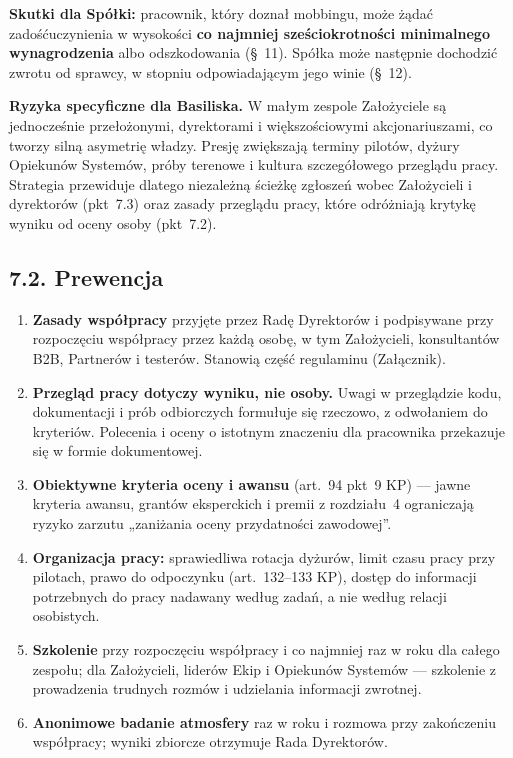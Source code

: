 \documentclass[11pt,a4paper]{report}
\begin{document}
\textbf{Skutki dla Spółki:} pracownik, który doznał mobbingu, może żądać zadośćuczynienia w wysokości \textbf{co najmniej sześciokrotności minimalnego wynagrodzenia} albo odszkodowania (§~11). Spółka może następnie dochodzić zwrotu od sprawcy, w stopniu odpowiadającym jego winie (§~12).

\begin{Prawo}
\textbf{Ryzyka specyficzne dla Basiliska.} W małym zespole Założyciele są jednocześnie przełożonymi, dyrektorami i większościowymi akcjonariuszami, co tworzy silną asymetrię władzy. Presję zwiększają terminy pilotów, dyżury Opiekunów Systemów, próby terenowe i kultura szczegółowego przeglądu pracy. Strategia przewiduje dlatego niezależną ścieżkę zgłoszeń wobec Założycieli i dyrektorów (pkt~7.3) oraz zasady przeglądu pracy, które odróżniają krytykę wyniku od oceny osoby (pkt~7.2).
\end{Prawo}

\subsection*{7.2. Prewencja}
\begin{enumerate}
  \item \textbf{Zasady współpracy} przyjęte przez Radę Dyrektorów i podpisywane przy rozpoczęciu współpracy przez każdą osobę, w tym Założycieli, konsultantów B2B, Partnerów i testerów. Stanowią część regulaminu (Załącznik).
  \item \textbf{Przegląd pracy dotyczy wyniku, nie osoby.} Uwagi w przeglądzie kodu, dokumentacji i prób odbiorczych formułuje się rzeczowo, z odwołaniem do kryteriów. Polecenia i oceny o istotnym znaczeniu dla pracownika przekazuje się w formie dokumentowej.
  \item \textbf{Obiektywne kryteria oceny i awansu} (art.~94 pkt~9 KP) --- jawne kryteria awansu, grantów eksperckich i premii z rozdziału~4 ograniczają ryzyko zarzutu „zaniżania oceny przydatności zawodowej”.
  \item \textbf{Organizacja pracy:} sprawiedliwa rotacja dyżurów, limit czasu pracy przy pilotach, prawo do odpoczynku (art.~132--133 KP), dostęp do informacji potrzebnych do pracy nadawany według zadań, a nie według relacji osobistych.
  \item \textbf{Szkolenie} przy rozpoczęciu współpracy i co najmniej raz w roku dla całego zespołu; dla Założycieli, liderów Ekip i Opiekunów Systemów --- szkolenie z prowadzenia trudnych rozmów i udzielania informacji zwrotnej.
  \item \textbf{Anonimowe badanie atmosfery} raz w roku i rozmowa przy zakończeniu współpracy; wyniki zbiorcze otrzymuje Rada Dyrektorów.
\end{enumerate}
\end{document}
